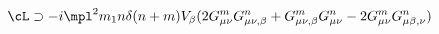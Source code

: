 \begin{equation}
\cL \supset - i \mpl^2 m_1 n \delta ( n + m ) V_{\beta} ( 2 G^m_{\mu \nu}
G^n_{\mu \nu , \beta} + G^m_{\mu \nu , \beta} G^n_{\mu \nu} - 2 G^m_{\mu \nu}
G^n_{\mu \beta , \nu} ) \label{Vint}
\end{equation} 

